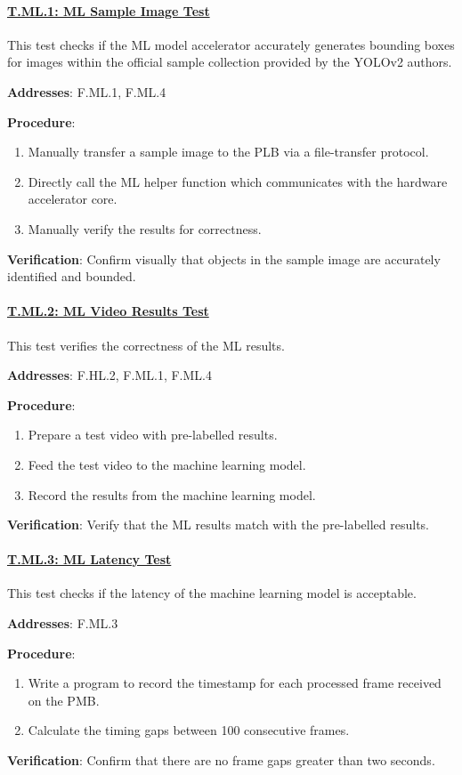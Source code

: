 \paragraph{\underline{T.ML.1: ML Sample Image Test}}

This test checks if the ML model accelerator accurately generates bounding boxes for images within the official sample collection provided by the YOLOv2 authors.

\textbf{Addresses}: F.ML.1, F.ML.4

\textbf{Procedure}:
\begin{enumerate}[noitemsep]
    \item Manually transfer a sample image to the PLB via a file-transfer protocol.
    \item Directly call the ML helper function which communicates with the hardware accelerator core.
    \item Manually verify the results for correctness.
\end{enumerate}

\textbf{Verification}: 
Confirm visually that objects in the sample image are accurately identified and bounded.

\paragraph{\underline{T.ML.2: ML Video Results Test}}

This test verifies the correctness of the ML results.

\textbf{Addresses}: F.HL.2, F.ML.1, F.ML.4

\textbf{Procedure}:
\begin{enumerate}[noitemsep]
    \item Prepare a test video with pre-labelled results.
    \item Feed the test video to the machine learning model.
    \item Record the results from the machine learning model.
\end{enumerate}

\textbf{Verification}: 
Verify that the ML results match with the pre-labelled results.

%
\paragraph{\underline{T.ML.3: ML Latency Test}}

This test checks if the latency of the machine learning model is acceptable.

\textbf{Addresses}: F.ML.3

\textbf{Procedure}:
\begin{enumerate}[noitemsep]
    \item Write a program to record the timestamp for each processed frame received on the PMB.
    \item Calculate the timing gaps between 100 consecutive frames.
\end{enumerate}

\textbf{Verification}: 
Confirm that there are no frame gaps greater than two seconds.